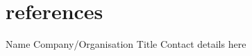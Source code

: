 \documentclass[]{friggeri-cv} %
\begin{document}

\section{references}


\begin{entrylist}


\entry
{}
{Name}
{Company/Organisation}
{Title}
{
Contact details here
}
\end{entrylist} 

\end{document}
